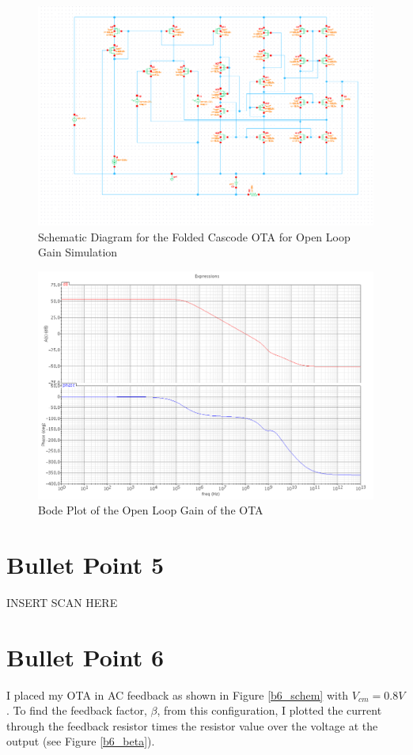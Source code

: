 \documentclass{article}
\begin{document}
\begin{figure}[H]
\centering
\includegraphics[width=7in]{bullet4_schem.png}
\caption{Schematic Diagram for the Folded Cascode OTA for Open Loop Gain Simulation}
\label{b4_schem}
\end{figure}

\begin{figure}[H]
\centering
\includegraphics[width=7in]{bullet4_bode.png}
\caption{Bode Plot of the Open Loop Gain of the OTA}
\label{b4_bode}
\end{figure}
\newpage

\section{Bullet Point 5}
INSERT SCAN HERE

\section{Bullet Point 6}
I placed my OTA in AC feedback as shown in Figure \ref{b6_schem} with $V_{cm} = 0.8V$. To find the feedback factor, $\beta$, from this configuration, I plotted the current through the feedback resistor times the resistor value over the voltage at the output (see Figure \ref{b6_beta}).
\end{document}
